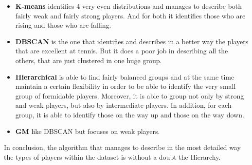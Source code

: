 \documentclass{article}
\begin{document}
\begin{itemize}
    \item{ \textbf{K-means} identifies 4 very even distributions and manages to describe both fairly weak and fairly strong players. And for both it identifies those who are rising and those who are falling.  }
    \item{ \textbf{DBSCAN} is the one that identifies and describes in a better way the players that are excellent at tennis. But it does a poor job in describing all the others, that are just clustered in one huge group.}
    \item{\textbf{Hierarchical} is able to find fairly balanced groups and at the same time maintain a certain flexibility in order to be able to identify the very small group of formidable players. Moreover, it is able to group not only by strong and weak players, but also by intermediate players. In addition, for each group, it is able to identify those on the way up and those on the way down.}
    \item{\textbf{GM}} like DBSCAN but focuses on weak players.
\end{itemize}

In conclusion, the algorithm that manages to describe in the most detailed way the types of players within the dataset is without a doubt the Hierarchy.
\end{document}
